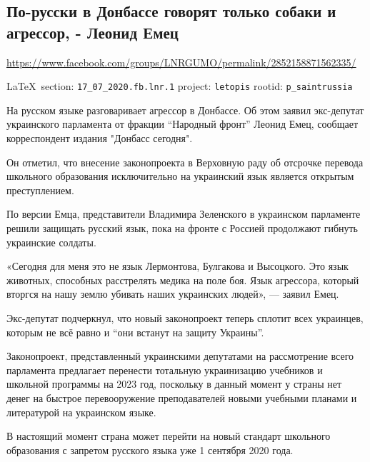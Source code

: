  
 
\subsection{По-русски в Донбассе говорят только собаки и агрессор, - Леонид Емец}
\url{https://www.facebook.com/groups/LNRGUMO/permalink/2852158871562335/}
  
\vspace{0.5cm}
{\small\LaTeX~section: \verb|17_07_2020.fb.lnr.1| project: \verb|letopis| rootid: \verb|p_saintrussia|}
\vspace{0.5cm}

На русском языке разговаривает агрессор в Донбассе. Об этом заявил экс-депутат
украинского парламента от фракции “Народный фронт” Леонид Емец, сообщает
корреспондент издания "Донбасс сегодня".

Он отметил, что внесение законопроекта в Верховную раду об отсрочке перевода
школьного образования исключительно на украинский язык является открытым
преступлением.

По версии Емца, представители Владимира Зеленского в украинском парламенте
решили защищать русский язык, пока на фронте с Россией продолжают гибнуть
украинские солдаты.

«Сегодня для меня это не язык Лермонтова, Булгакова и Высоцкого. Это язык
животных, способных расстрелять медика на поле боя. Язык агрессора, который
вторгся на нашу землю убивать наших украинских людей», — заявил Емец.

Экс-депутат подчеркнул, что новый законопроект теперь сплотит всех украинцев,
которым не всё равно и “они встанут на защиту Украины”.

Законопроект, представленный украинскими депутатами на рассмотрение всего
парламента предлагает перенести тотальную украинизацию учебников и школьной
программы на 2023 год, поскольку в данный момент у страны нет денег на быстрое
перевооружение преподавателей новыми учебными планами и литературой на
украинском языке.

В настоящий момент страна может перейти на новый стандарт школьного образования
с запретом русского языка уже 1 сентября 2020 года. 
